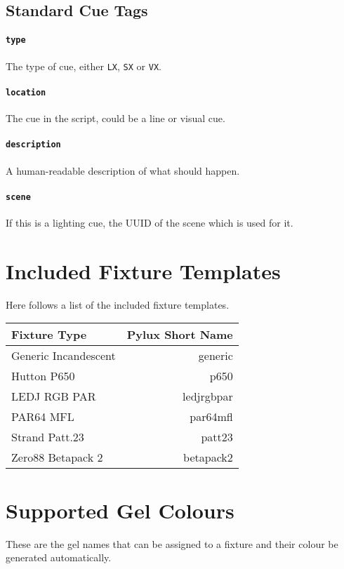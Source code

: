 \documentclass[a4paper]{article}
\begin{document}
\subsection{Standard Cue Tags}

\paragraph{\texttt{type}}
The type of cue, either \texttt{LX}, \texttt{SX} or \texttt{VX}.

\paragraph{\texttt{location}}
The cue in the script, could be a line or visual cue.

\paragraph{\texttt{description}}
A human-readable description of what should happen.

\paragraph{\texttt{scene}}
If this is a lighting cue, the UUID of the scene which is used for it.

\appendix
\section{Included Fixture Templates}
Here follows a list of the included fixture templates.
\begin{longtable}{|l|r|}
\hline
Fixture Type & Pylux Short Name \\ \hline
Generic Incandescent & generic \\
Hutton P650 & p650 \\
LEDJ RGB PAR & ledjrgbpar \\
PAR64 MFL & par64mfl \\
Strand Patt.23 & patt23 \\
Zero88 Betapack 2 & betapack2 \\
\hline
\end{longtable}

\section{Supported Gel Colours}
These are the gel names that can be assigned to a fixture and their colour be 
generated automatically.
\end{document}
